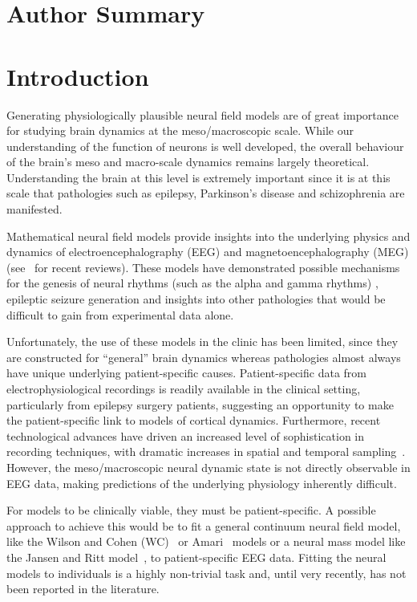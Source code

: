 \documentclass[10pt]{article}
\begin{document}
\section*{Author Summary}

\section*{Introduction}
Generating physiologically plausible neural field models are of great importance for studying brain dynamics at the meso/macroscopic scale. While our understanding of the function of neurons is well developed, the overall behaviour of the brain's meso and macro-scale dynamics remains largely theoretical. Understanding the brain at this level is extremely important since it is at this scale that pathologies such as epilepsy, Parkinson's disease and schizophrenia are manifested. 

Mathematical neural field models provide insights into the underlying physics and dynamics of electroencephalography (EEG) and magnetoencephalography (MEG) (see~\cite{Deco2008,David2003} for recent reviews). These models have demonstrated possible mechanisms for the genesis of neural rhythms (such as the alpha and gamma rhythms) \cite{Liley1999,RENNIE2000}, epileptic seizure generation \cite{DaSilva2003,Suffczynski2004,Wendling2005} and insights into other pathologies \cite{Moran2008,Schiff2009} that would be difficult to gain from experimental data alone. 

Unfortunately, the use of these models in the clinic has been limited, since they are constructed for ``general'' brain dynamics whereas pathologies almost always have unique underlying patient-specific causes. Patient-specific data from electrophysiological recordings is readily available in the clinical setting, particularly from epilepsy surgery patients, suggesting an opportunity to make the patient-specific link to models of cortical dynamics. Furthermore, recent technological advances have driven an increased level of sophistication in recording techniques, with dramatic increases in spatial and temporal sampling~\cite{Brinkmann2009}. However, the meso/macroscopic neural dynamic state is not directly observable in EEG data, making predictions of the underlying physiology inherently difficult.

For models to be clinically viable, they must be patient-specific. A possible approach to achieve this would be to fit a general continuum neural field model, like the Wilson and Cohen (WC)~\cite{Wilson1973} or Amari~\cite{Amari1977} models or a neural mass model like the Jansen and Ritt model~\cite{Jansen1995}, to patient-specific EEG data. Fitting the neural models to individuals is a highly non-trivial task and, until very recently, has not been reported in the literature. 
\end{document}
